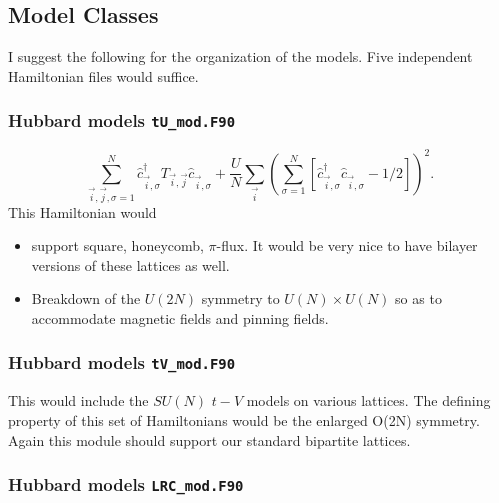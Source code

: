 

\subsection{  Model Classes }

I suggest the following for the organization of the models.    Five independent Hamiltonian   files would suffice.


\subsubsection{Hubbard models   \texttt{tU\_mod.F90}}

\begin{equation}
    \sum_{\vec{i},\vec{j},\sigma=1}^{N}  \hat{c}^{\dagger}_{\vec{i},\sigma } T_{\vec{i},\vec{j}} \hat{c}^{\phantom\dagger}_{\vec{i},\sigma }     +  \frac{U}{N} \sum_{\vec{i}} \left(\sum_{\sigma=1}^{N}  \left[   \hat{c}^{\dagger}_{\vec{i},\sigma } 
    \hat{c}^{\phantom\dagger}_{\vec{i},\sigma }  - 1/2  \right] \right)^2 .
\end{equation}
This Hamiltonian would
\begin{itemize} 
\item support   square,  honeycomb,  $\pi$-flux.  It would be very nice to have bilayer versions of these lattices as well. 
\item Breakdown of the $U(2N)$ symmetry to $U(N) \times U(N)$ so as to accommodate magnetic fields and pinning fields.  
\end{itemize}


\subsubsection{Hubbard models   \texttt{tV\_mod.F90}}

This would include the $SU(N)$  $t-V$ models on various lattices.  The defining property of this set of Hamiltonians would be the enlarged O(2N) symmetry.  Again  this   module should support our standard bipartite lattices. 


\subsubsection{Hubbard models   \texttt{LRC\_mod.F90}}

